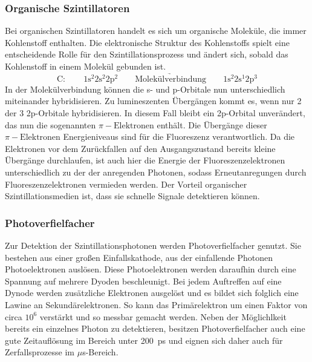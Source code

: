             \subsubsection*{Organische Szintillatoren}
                Bei organischen Szintillatoren handelt es sich um organische Moleküle, die immer Kohlenstoff enthalten. Die elektronische Struktur des Kohlenstoffs spielt eine entscheidende Rolle für den
                Szintillationsprozess und ändert sich, sobald das Kohlenstoff in einem Molekül gebunden ist.
                \begin{equation*}
                    \text{C}: \qquad 1\text{s}^2 2\text{s}^2 2\text{p}^2 \qquad \underrightarrow{\text{Molekülverbindung}} \qquad 1\text{s}^2 2\text{s}^1 2\text{p}^3
                \end{equation*}
                In der Molekülverbindung können die s- und p-Orbitale nun unterschiedlich miteinander hybridisieren. Zu lumineszenten Übergängen kommt es, wenn nur 2 der 3 2p-Orbitale hybridisieren. In diesem
                Fall bleibt ein 2p-Orbital unverändert, das nun die sogenannten $\pi-\text{Elektronen}$ enthält. Die Übergänge dieser $\pi-\text{Elektronen}$ Energieniveaus sind für die Fluoreszenz verantwortlich.
                Da die Elektronen vor dem Zurückfallen auf den Ausgangszustand bereits kleine Übergänge durchlaufen, ist auch hier die Energie der Fluoreszenzelektronen unterschiedlich zu der der anregenden
                Photonen, sodass Erneutanregungen durch Fluoreszenzelektronen vermieden werden. Der Vorteil organischer Szintillationsmedien ist, dass sie schnelle Signale detektieren können.
            \newpage
            \subsubsection*{Photoverfielfacher}
                Zur Detektion der Szintillationsphotonen werden Photoverfielfacher genutzt. Sie bestehen aus einer großen Einfallskathode, aus der einfallende Photonen Photoelektronen auslösen. Diese
                Photoelektronen werden daraufhin durch eine Spannung auf mehrere Dyoden beschleunigt. Bei jedem Auftreffen auf eine Dynode werden zusätzliche Elektronen ausgelöst und es bildet sich 
                folglich eine Lawine an Sekundärelektronen. So kann das Primärelektron um einen Faktor von circa $10^6$ verstärkt und so messbar gemacht werden. Neben der Möglichlkeit bereits ein einzelnes 
                Photon zu detektieren, besitzen Photoverfielfacher auch eine gute Zeitauflösung im  Bereich unter \SI{200}{\pico\second} und eignen sich daher auch für Zerfallsprozesse im $\mu$s-Bereich.

